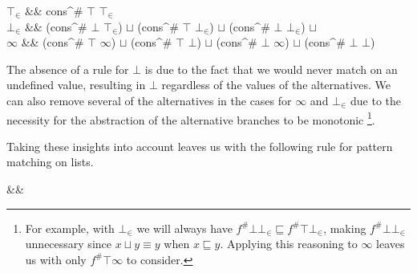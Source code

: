 \begin{haskell}
    \(\top_{\in}\) &\to& cons^{\#} \(\top\) \(\top_{\in}\)              \\  
    \(\bot_{\in}\) &\to& (cons^{\#} \(\bot\) \(\top_{\in}\)) \(\sqcup\)
                         (cons^{\#} \(\top\) \(\bot_{\in}\)) \(\sqcup\)
                         (cons^{\#} \(\bot\) \(\bot_{\in}\)) \(\sqcup\) \\  
    \(\infty\)     &\to& (cons^{\#} \(\top\) \(\infty\))     \(\sqcup\)
                         (cons^{\#} \(\top\) \(\bot\))       \(\sqcup\)
                         (cons^{\#} \(\bot\) \(\infty\))      \(\sqcup\)
                         (cons^{\#} \(\bot\) \(\bot\))
\end{haskell}

The absence of a rule for $\bot$ is due to the fact that we would never match
on an undefined value, resulting in $\bot$ regardless of the values of the
alternatives. We can also remove several of the alternatives in the cases for
$\infty$ and $\bot_{\in}$ due to the necessity for the abstraction of the
alternative branches to be monotonic \citep{wadler1987strictness}\footnote{For
example, with \(\bot_{\in}\) we will always have \(f^{\#} \bot \bot_{\in}
\sqsubseteq f^{\#} \top \bot_{\in}\), making \(f^{\#} \bot \bot_{\in}\)
unnecessary since \(x \sqcup y \equiv y\) when \(x \sqsubseteq y\). Applying
this reasoning to \(\infty\) leaves us with only \(f^{\#} \top \infty\) to
consider.}.

Taking these insights into account leaves us with the following rule for
pattern matching on lists.

\begin{haskell*}
 \hasphi && \\
 
\end{haskell*}

